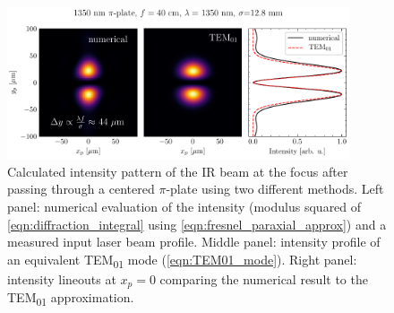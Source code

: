 \begin{figure}
	\centering
	\includegraphics[width=0.9\textwidth]{figures/chap1/pi_plate_focus_LP_TEM_1350nm.pdf}
	\caption{Calculated intensity pattern of the IR beam at the focus after passing through a centered $\pi$-plate using two different methods. Left panel: numerical evaluation of the intensity (modulus squared of \cref{eqn:diffraction_integral} using \cref{eqn:fresnel_paraxial_approx}) and a measured input laser beam profile. Middle panel: intensity profile of an equivalent TEM\textsubscript{01} mode (\cref{eqn:TEM01_mode}). Right panel: intensity lineouts at $x_p = 0$ comparing the numerical result to the TEM\textsubscript{01} approximation.}
	\label{fig:pi_plate_focus_sim}
\end{figure}


